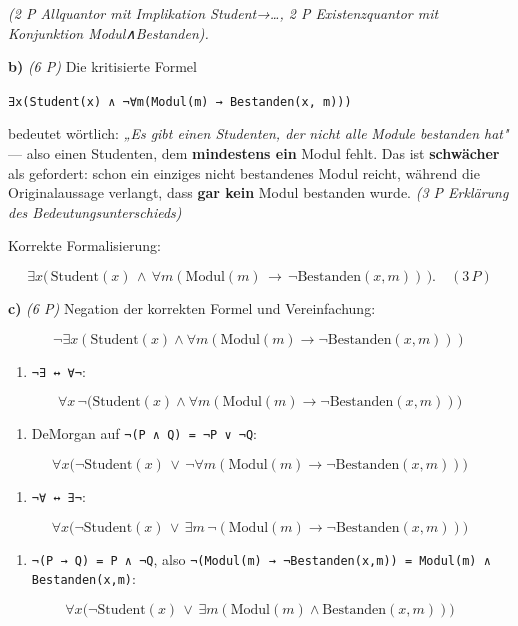 \documentclass[11pt, a4paper]{article}
\begin{document}
\textit{(2 P Allquantor mit Implikation Student→…, 2 P Existenzquantor mit Konjunktion Modul∧Bestanden).}


\textbf{b)} \textit{(6 P)} Die kritisierte Formel

\texttt{∃x(Student(x) ∧ ¬∀m(Modul(m) → Bestanden(x, m)))}

bedeutet wörtlich: \textit{„Es gibt einen Studenten, der }\textit{nicht alle}\textit{ Module bestanden hat"} — also einen Studenten, dem \textbf{mindestens ein} Modul fehlt. Das ist \textbf{schwächer} als gefordert: schon ein einziges nicht bestandenes Modul reicht, während die Originalaussage verlangt, dass \textbf{gar kein} Modul bestanden wurde. \textit{(3 P Erklärung des Bedeutungsunterschieds)}


Korrekte Formalisierung:

\[
\exists x \big(\, \text{Student}(x) \,\land\, \forall m (\text{Modul}(m) \,\to\, \neg \text{Bestanden}(x, m)) \,\big). \quad(3\,P)
\]


\textbf{c)} \textit{(6 P)} Negation der korrekten Formel und Vereinfachung:


\[
\neg \exists x (\text{Student}(x) \land \forall m (\text{Modul}(m) \to \neg \text{Bestanden}(x, m)))
\]


\begin{enumerate}
  \item \texttt{¬∃ ↔ ∀¬}:
\end{enumerate}
\[
\forall x \,\neg\big(\text{Student}(x) \land \forall m (\text{Modul}(m) \to \neg \text{Bestanden}(x, m))\big)
\]

\begin{enumerate}
  \item DeMorgan auf \texttt{¬(P ∧ Q) = ¬P ∨ ¬Q}:
\end{enumerate}
\[
\forall x \big(\neg \text{Student}(x) \,\lor\, \neg \forall m (\text{Modul}(m) \to \neg \text{Bestanden}(x, m))\big)
\]

\begin{enumerate}
  \item \texttt{¬∀ ↔ ∃¬}:
\end{enumerate}
\[
\forall x \big(\neg \text{Student}(x) \,\lor\, \exists m \,\neg(\text{Modul}(m) \to \neg \text{Bestanden}(x, m))\big)
\]

\begin{enumerate}
  \item \texttt{¬(P → Q) = P ∧ ¬Q}, also \texttt{¬(Modul(m) → ¬Bestanden(x,m)) = Modul(m) ∧ Bestanden(x,m)}:
\end{enumerate}
\[
\forall x \big(\neg \text{Student}(x) \,\lor\, \exists m (\text{Modul}(m) \land \text{Bestanden}(x, m))\big)
\]
\end{document}
